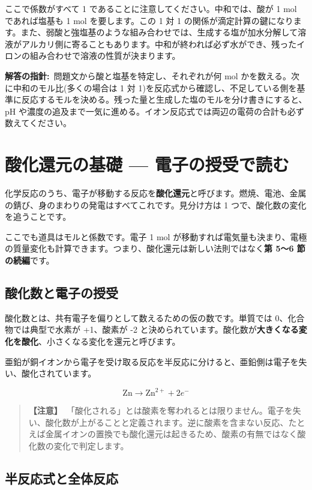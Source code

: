 \documentclass{article}
\begin{document}
ここで係数がすべて 1 であることに注意してください。中和では、酸が 1 mol であれば塩基も 1 mol を要します。この 1 対 1 の関係が滴定計算の鍵になります。また、弱酸と強塩基のような組み合わせでは、生成する塩が加水分解して溶液がアルカリ側に寄ることもあります。中和が終われば必ず水ができ、残ったイロンの組み合わせで溶液の性質が決まります。

\textbf{解答の指針:}\ 問題文から酸と塩基を特定し、それぞれが何 mol かを数える。次に中和のモル比(多くの場合は 1 対 1)を反応式から確認し、不足している側を基準に反応するモルを決める。残った量と生成した塩のモルを分け書きにすると、pH や濃度の追及まで一気に進める。イオン反応式では両辺の電荷の合計も必ず数えてください。

\section{酸化還元の基礎 — 電子の授受で読む}

化学反応のうち、電子が移動する反応を\textbf{酸化還元}と呼びます。燃焼、電池、金属の錆び、身のまわりの発電はすべてこれです。見分け方は 1 つで、酸化数の変化を追うことです。

ここでも道具はモルと係数です。電子 1 mol が移動すれば電気量も決まり、電極の質量変化も計算できます。つまり、酸化還元は新しい法則ではなく\textbf{第 5〜6 節の続編}です。

\subsection{酸化数と電子の授受}

酸化数とは、共有電子を偏りとして数えるための仮の数です。単質では 0、化合物では典型で水素が +1、酸素が -2 と決められています。酸化数が\textbf{大きくなる変化を酸化}、小さくなる変化を還元と呼びます。

亜鉛が銅イオンから電子を受け取る反応を半反応に分けると、亜鉛側は電子を失い、酸化されています。

\[ \mathrm{Zn} \rightarrow \mathrm{Zn}^{2+} + 2e^{-} \]

\begin{quote}
\textbf{【注意】}\ 「酸化される」とは酸素を奪われるとは限りません。電子を失い、酸化数が上がることと定義されます。逆に酸素を含まない反応、たとえば金属イオンの置換でも酸化還元は起きるため、酸素の有無ではなく酸化数の変化で判定します。
\end{quote}

\subsection{半反応式と全体反応}
\end{document}
